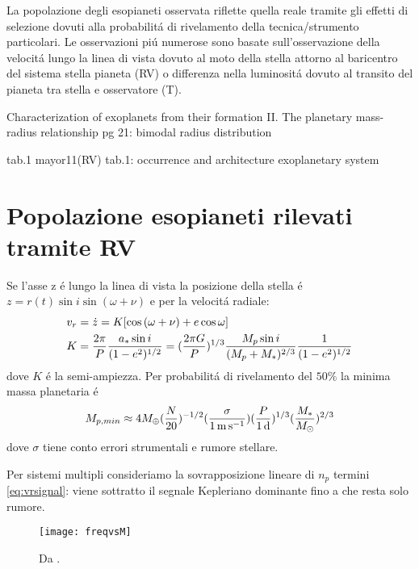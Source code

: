 La popolazione degli esopianeti osservata riflette quella reale tramite gli effetti di selezione dovuti alla probabilit\'a di rivelamento della tecnica/strumento particolari. Le osservazioni pi\'u numerose sono basate sull'osservazione della velocit\'a lungo la linea di vista dovuto al moto della stella attorno al baricentro del sistema stella pianeta (RV) o differenza nella luminosit\'a dovuto al transito del pianeta tra stella e osservatore (T).

\begin{workout}
Characterization of exoplanets from their formation II. The planetary mass-radius relationship pg 21: bimodal radius distribution
\end{workout}

\begin{workout}
tab.1 mayor11(RV)
tab.1: occurrence and architecture exoplanetary system 
\end{workout}

\section{Popolazione esopianeti rilevati tramite RV}

Se l'asse z \'e lungo la linea di vista la posizione della stella \'e $z=r(t)\sin{i}\sin{(\omega+\nu)}$ e per la velocit\'a radiale:
\begin{align}
&v_r=\dot{z}=K[\cos{(\omega+\nu)}+e\cos{\omega}]\label{eq:vrsignal}\\
&K=\frac{2\pi}{P}\frac{a_*\sin{i}}{(1-e^2)^{1/2}}=(\frac{2\pi G}{P})^{1/3}\frac{M_p\sin{i}}{(M_p+M_*)^{2/3}}\frac{1}{(1-e^2)^{1/2}}
\end{align}
dove $K$ \'e la semi-ampiezza.
Per probabilit\'a di rivelamento del $50\%$ la minima massa planetaria \'e
\begin{equation}
M_{p,min}\approx4\mearth{}(\frac{N}{20})\expy{-1/2}(\frac{\sigma}{\SI{1}{\meter\per\second}})(\frac{P}{\SI{1}{\day}})\expy{1/3}(\frac{M_*}{\msun{}})\expy{2/3}
\end{equation}
dove $\sigma$ tiene conto errori strumentali e rumore stellare.

Per sistemi multipli consideriamo la sovrapposizione lineare di $n_p$ termini \eqref{eq:vrsignal}: viene sottratto il segnale Kepleriano dominante fino a che resta solo rumore.

\begin{wrapfigure}[5]{l}{0.35\textwidth}
\texttt{[image: freqvsM]}
\caption{Da \cite{mayor2011harps}.}\label{fig:Mdistro}
\end{wrapfigure}


